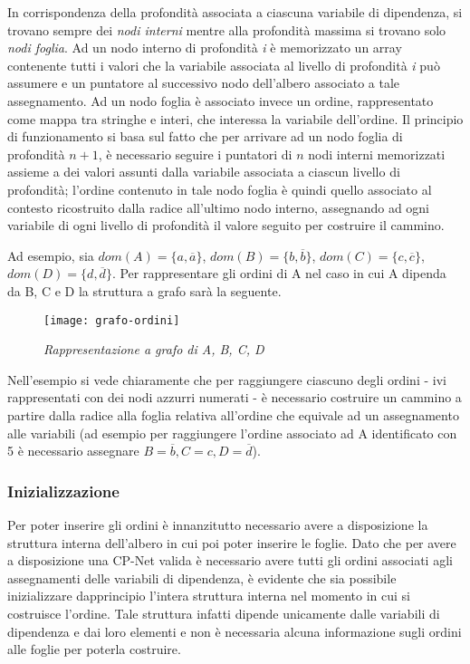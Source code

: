 In corrispondenza della profondità associata a ciascuna variabile di
dipendenza, si trovano sempre dei \emph{nodi interni} mentre alla
profondità massima si trovano solo \emph{nodi foglia}. Ad un nodo
interno di profondità \emph{i} è memorizzato un array contenente tutti
i valori che la variabile associata al livello di profondità \emph{i}
può assumere e un puntatore al successivo nodo dell'albero associato a
tale assegnamento. Ad un nodo foglia è associato invece un ordine,
rappresentato come mappa tra stringhe e interi, che interessa la
variabile dell'ordine. Il principio di funzionamento si basa sul fatto
che per arrivare ad un nodo foglia di profondità $n+1$, è necessario
seguire i puntatori di $n$ nodi interni memorizzati assieme a dei
valori assunti dalla variabile associata a ciascun livello di
profondità; l'ordine contenuto in tale nodo foglia è quindi quello
associato al contesto ricostruito dalla radice all'ultimo nodo
interno, assegnando ad ogni variabile di ogni livello di profondità il
valore seguito per costruire il cammino.

Ad esempio, sia $dom(A)=\{a, \overline{a}\}$, $dom(B)=\{b,
\overline{b}\}$, $dom(C)=\{c, \overline{c}\}$, $dom(D)=\{d,
\overline{d}\}$. Per rappresentare gli ordini di A nel caso in cui A
dipenda da B, C e D la struttura a grafo sarà la seguente.

\begin{center}
  \begin{figure}[ht]
    \centering
    \texttt{[image: grafo-ordini]}
    \caption{\textit{Rappresentazione a grafo di A, B, C, D}}
  \end{figure}
\end{center}

Nell'esempio si vede chiaramente che per raggiungere ciascuno degli
ordini - ivi rappresentati con dei nodi azzurri numerati - è
necessario costruire un cammino a partire dalla radice alla foglia
relativa all'ordine che equivale ad un assegnamento alle variabili (ad
esempio per raggiungere l'ordine associato ad A identificato con 5 è
necessario assegnare $B=\overline{b}, C=c, D=\overline{d}$).

\subsubsection{Inizializzazione}
Per poter inserire gli ordini è innanzitutto necessario avere a
disposizione la struttura interna dell'albero in cui poi poter
inserire le foglie. Dato che per avere a disposizione una CP-Net
valida è necessario avere tutti gli ordini associati agli assegnamenti
delle variabili di dipendenza, è evidente che sia possibile
inizializzare dapprincipio l'intera struttura interna nel momento in
cui si costruisce l'ordine. Tale struttura infatti dipende unicamente
dalle variabili di dipendenza e dai loro elementi e non è necessaria
alcuna informazione sugli ordini alle foglie per poterla costruire.

